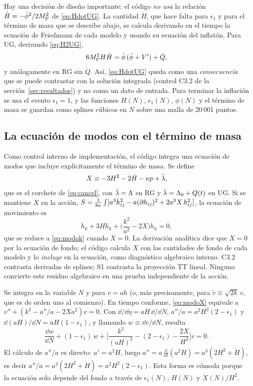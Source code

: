 Hay una decisión de diseño importante: el código \emph{no usa} la relación $\dot H=-\dot\phi^2/2M_{\rm P}^2$ de \eqref{eq:HdotUG}. La cantidad $\dot H$, que hace falta para $\epsilon_1$ y para el término de masa que se describe abajo, se calcula derivando en el tiempo la ecuación de Friedmann de cada modelo y usando su ecuación del inflatón. Para UG, derivando \eqref{eq:H2UG},
\begin{equation}
6M_{\rm P}^2H\dot H=\dot\phi\,(\ddot\phi+V')+\dot Q,
\label{eq:HdotCode}
\end{equation}
y análogamente en RG sin $\dot Q$. Así, \eqref{eq:HdotUG} queda como una \emph{consecuencia} que se puede contrastar con la solución integrada (control C3.2 de la sección~\ref{sec:resultados}) y no como un dato de entrada. Para terminar la inflación se usa el evento $\epsilon_1=1$, y las funciones $H(N)$, $\epsilon_1(N)$, $\phi(N)$ y el término de masa se guardan como splines cúbicos en $N$ sobre una malla de 20\,001 puntos.

\subsection{La ecuación de modos con el término de masa}
\label{sec:ecmodosnum}

Como control interno de implementación, el código integra una ecuación de modos que incluye explícitamente el término de masa. Se define
\begin{equation}
X\equiv-3H^2-2\dot H-\kappa p+\bar\lambda,
\label{eq:Xdef}
\end{equation}
que es el corchete de \eqref{eq:cancel}, con $\bar\lambda=\Lambda$ en RG y $\bar\lambda=\Lambda_0+Q(t)$ en UG. Si se mantiene $X$ en la acción, $S=\frac{1}{8\kappa}\int[a^3\dot h_{ij}^2-a(\partial h_{ij})^2+2a^3X\,h_{ij}^2]$, la ecuación de movimiento es 
\begin{equation}
\ddot h_k+3H\dot h_k+\Big(\frac{k^2}{a^2}-2X\Big)h_k=0,
\label{eq:modoX}
\end{equation}
que se reduce a \eqref{eq:modok} cuando $X=0$. La derivación analítica dice que $X=0$ por la ecuación de fondo; el código calcula $X$ con las cantidades de fondo de cada modelo y lo \emph{incluye} en la ecuación, como diagnóstico algebraico interno. C3.2 contrasta derivadas de splines; S1 contrasta la proyección TT lineal. Ninguno convierte este residuo algebraico en una prueba independiente de la acción.

Se integra en la variable $N$ y para $v=ah$ (o, más precisamente, para $\tilde v\equiv\sqrt{2k}\,v$, que es de orden uno al comienzo). En tiempo conforme, \eqref{eq:modoX} equivale a $v''+(k^2-a''/a-2Xa^2)v=0$. Con $\dd/\dd\eta=aH\,\dd/\dd N$, $a''/a=a^2H^2(2-\epsilon_1)$ y $\dd(aH)/\dd N=aH(1-\epsilon_1)$, y llamando $w\equiv\dd v/\dd N$, resulta 
\begin{equation}
\frac{\dd w}{\dd N}+(1-\epsilon_1)\,w+\Big[\frac{k^2}{(aH)^2}-(2-\epsilon_1)-\frac{2X}{H^2}\Big]v=0.
\label{eq:modoN}
\end{equation}
El cálculo de $a''/a$ es directo: $a'=a^2H$, luego $a''=a\,\tfrac{\dd}{\dd t}(a^2H)=a^3(2H^2+\dot H)$, es decir $a''/a=a^2(2H^2+\dot H)=a^2H^2(2-\epsilon_1)$. Esta forma es cómoda porque la ecuación solo depende del fondo a través de $\epsilon_1(N)$, $H(N)$ y $X(N)/H^2$.

